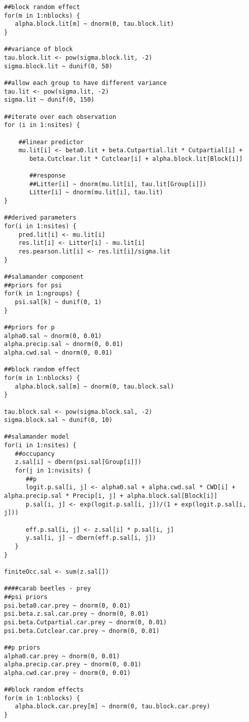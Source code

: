 \begin{lstlisting}
##block random effect
for(m in 1:nblocks) {
   alpha.block.lit[m] ~ dnorm(0, tau.block.lit)
}

##variance of block
tau.block.lit <- pow(sigma.block.lit, -2)
sigma.block.lit ~ dunif(0, 50)

##allow each group to have different variance
tau.lit <- pow(sigma.lit, -2)
sigma.lit ~ dunif(0, 150)

##iterate over each observation
for (i in 1:nsites) {

    ##linear predictor  
    mu.lit[i] <- beta0.lit + beta.Cutpartial.lit * Cutpartial[i] + 
       beta.Cutclear.lit * Cutclear[i] + alpha.block.lit[Block[i]]

       ##response
       ##Litter[i] ~ dnorm(mu.lit[i], tau.lit[Group[i]])
       Litter[i] ~ dnorm(mu.lit[i], tau.lit)
}

##derived parameters
for(i in 1:nsites) {
    pred.lit[i] <- mu.lit[i]
    res.lit[i] <- Litter[i] - mu.lit[i]
    res.pearson.lit[i] <- res.lit[i]/sigma.lit
}

##salamander component
##priors for psi
for(k in 1:ngroups) {
   psi.sal[k] ~ dunif(0, 1)
}

##priors for p
alpha0.sal ~ dnorm(0, 0.01)
alpha.precip.sal ~ dnorm(0, 0.01)
alpha.cwd.sal ~ dnorm(0, 0.01)

##block random effect
for(m in 1:nblocks) {
   alpha.block.sal[m] ~ dnorm(0, tau.block.sal)
}

tau.block.sal <- pow(sigma.block.sal, -2)
sigma.block.sal ~ dunif(0, 10)

##salamander model
for(i in 1:nsites) {
   ##occupancy
   z.sal[i] ~ dbern(psi.sal[Group[i]])
   for(j in 1:nvisits) {
      ##p
      logit.p.sal[i, j] <- alpha0.sal + alpha.cwd.sal * CWD[i] + alpha.precip.sal * Precip[i, j] + alpha.block.sal[Block[i]]
      p.sal[i, j] <- exp(logit.p.sal[i, j])/(1 + exp(logit.p.sal[i, j]))

      eff.p.sal[i, j] <- z.sal[i] * p.sal[i, j]
      y.sal[i, j] ~ dbern(eff.p.sal[i, j])
   }
}

finiteOcc.sal <- sum(z.sal[])

####carab beetles - prey
##psi priors
psi.beta0.car.prey ~ dnorm(0, 0.01)
psi.beta.z.sal.car.prey ~ dnorm(0, 0.01)
psi.beta.Cutpartial.car.prey ~ dnorm(0, 0.01)
psi.beta.Cutclear.car.prey ~ dnorm(0, 0.01)

##p priors
alpha0.car.prey ~ dnorm(0, 0.01)
alpha.precip.car.prey ~ dnorm(0, 0.01)
alpha.cwd.car.prey ~ dnorm(0, 0.01)

##block random effects
for(m in 1:nblocks) {
   alpha.block.car.prey[m] ~ dnorm(0, tau.block.car.prey)
}


\end{lstlisting}
